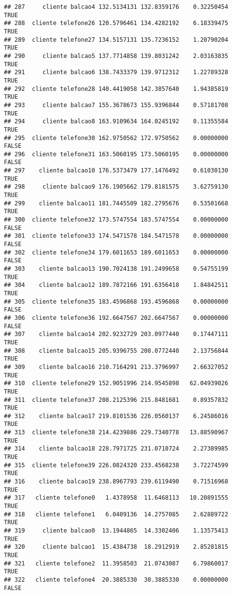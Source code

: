 \documentclass[
]{article}
\begin{document}
\begin{verbatim}
## 287     cliente balcao4 132.5134131 132.8359176    0.32250454     TRUE
## 288  cliente telefone26 120.5796461 134.4282192    6.18339475     TRUE
## 289  cliente telefone27 134.5157131 135.7236152    1.20790204     TRUE
## 290     cliente balcao5 137.7714858 139.8031242    2.03163835     TRUE
## 291     cliente balcao6 138.7433379 139.9712312    1.22789328     TRUE
## 292  cliente telefone28 140.4419058 142.3857640    1.94385819     TRUE
## 293     cliente balcao7 155.3678673 155.9396844    0.57181708     TRUE
## 294     cliente balcao8 163.9109634 164.0245192    0.11355584     TRUE
## 295  cliente telefone30 162.9750562 172.9750562    0.00000000    FALSE
## 296  cliente telefone31 163.5060195 173.5060195    0.00000000    FALSE
## 297    cliente balcao10 176.5373479 177.1476492    0.61030130     TRUE
## 298     cliente balcao9 176.1905662 179.8181575    3.62759130     TRUE
## 299    cliente balcao11 181.7445509 182.2795676    0.53501668     TRUE
## 300  cliente telefone32 173.5747554 183.5747554    0.00000000    FALSE
## 301  cliente telefone33 174.5471578 184.5471578    0.00000000    FALSE
## 302  cliente telefone34 179.6011653 189.6011653    0.00000000    FALSE
## 303    cliente balcao13 190.7024138 191.2499658    0.54755199     TRUE
## 304    cliente balcao12 189.7872166 191.6356418    1.84842511     TRUE
## 305  cliente telefone35 183.4596868 193.4596868    0.00000000    FALSE
## 306  cliente telefone36 192.6647567 202.6647567    0.00000000    FALSE
## 307    cliente balcao14 202.9232729 203.0977440    0.17447111     TRUE
## 308    cliente balcao15 205.9396755 208.0772440    2.13756844     TRUE
## 309    cliente balcao16 210.7164291 213.3796997    2.66327052     TRUE
## 310  cliente telefone29 152.9051996 214.9545898   62.04939026     TRUE
## 311  cliente telefone37 208.2125396 215.8481681    0.89357832     TRUE
## 312    cliente balcao17 219.8101536 226.0560137    6.24586016     TRUE
## 313  cliente telefone38 214.4239886 229.7340778   13.88590967     TRUE
## 314    cliente balcao18 228.7971725 231.0710724    2.27389985     TRUE
## 315  cliente telefone39 226.0824320 233.4568238    3.72274599     TRUE
## 316    cliente balcao19 238.8967793 239.6119490    0.71516968     TRUE
## 317   cliente telefone0   1.4378958  11.6468113   10.20891555     TRUE
## 318   cliente telefone1   6.0409136  14.2757085    2.62889722     TRUE
## 319     cliente balcao0  13.1944865  14.3302406    1.13575413     TRUE
## 320     cliente balcao1  15.4384738  18.2912919    2.85281815     TRUE
## 321   cliente telefone2  11.3958503  21.0743087    6.79860017     TRUE
## 322   cliente telefone4  20.3885330  30.3885330    0.00000000    FALSE

\end{verbatim}
\end{document}
